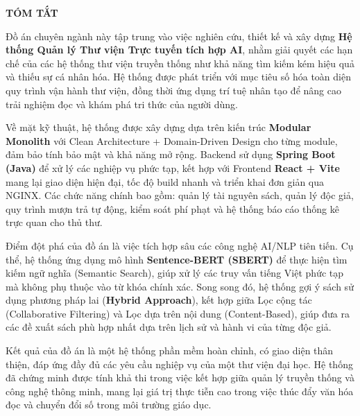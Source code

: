 \thispagestyle{empty}

\noindent
\vspace{0.2cm}
\begin{center}
    \textbf{\LARGE TÓM TẮT}
\end{center}
\vspace{1cm} %


Đồ án chuyên ngành này tập trung vào việc nghiên cứu, thiết kế và xây dựng \textbf{Hệ thống Quản lý Thư viện Trực tuyến tích hợp AI}, nhằm giải quyết các hạn chế của các hệ thống thư viện truyền thống như khả năng tìm kiếm kém hiệu quả và thiếu sự cá nhân hóa. Hệ thống được phát triển với mục tiêu số hóa toàn diện quy trình vận hành thư viện, đồng thời ứng dụng trí tuệ nhân tạo để nâng cao trải nghiệm đọc và khám phá tri thức của người dùng.

Về mặt kỹ thuật, hệ thống được xây dựng dựa trên kiến trúc \textbf{Modular Monolith} với Clean Architecture + Domain-Driven Design cho từng module, đảm bảo tính bảo mật và khả năng mở rộng. Backend sử dụng \textbf{Spring Boot (Java)} để xử lý các nghiệp vụ phức tạp, kết hợp với Frontend \textbf{React + Vite} mang lại giao diện hiện đại, tốc độ build nhanh và triển khai đơn giản qua NGINX. Các chức năng chính bao gồm: quản lý tài nguyên sách, quản lý độc giả, quy trình mượn trả tự động, kiểm soát phí phạt và hệ thống báo cáo thống kê trực quan cho thủ thư.

Điểm đột phá của đồ án là việc tích hợp sâu các công nghệ AI/NLP tiên tiến. Cụ thể, hệ thống ứng dụng mô hình \textbf{Sentence-BERT (SBERT)} để thực hiện tìm kiếm ngữ nghĩa (Semantic Search), giúp xử lý các truy vấn tiếng Việt phức tạp mà không phụ thuộc vào từ khóa chính xác. Song song đó, hệ thống gợi ý sách sử dụng phương pháp lai (\textbf{Hybrid Approach}), kết hợp giữa Lọc cộng tác (Collaborative Filtering) và Lọc dựa trên nội dung (Content-Based), giúp đưa ra các đề xuất sách phù hợp nhất dựa trên lịch sử và hành vi của từng độc giả.

Kết quả của đồ án là một hệ thống phần mềm hoàn chỉnh, có giao diện thân thiện, đáp ứng đầy đủ các yêu cầu nghiệp vụ của một thư viện đại học. Hệ thống đã chứng minh được tính khả thi trong việc kết hợp giữa quản lý truyền thống và công nghệ thông minh, mang lại giá trị thực tiễn cao trong việc thúc đẩy văn hóa đọc và chuyển đổi số trong môi trường giáo dục.
